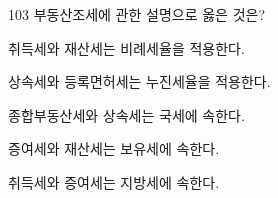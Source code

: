\begin{question}{103}
부동산조세에 관한 설명으로 옳은 것은?
\begin{choices}
  \item 취득세와 재산세는 비례세율을 적용한다.
  \item 상속세와 등록면허세는 누진세율을 적용한다.
  \item 종합부동산세와 상속세는 국세에 속한다.
  \item 증여세와 재산세는 보유세에 속한다.
  \item 취득세와 증여세는 지방세에 속한다.
\end{choices}
\end{question}
